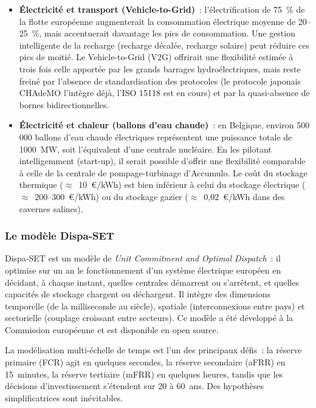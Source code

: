 \begin{itemize}
    \item \textbf{Électricité et transport (Vehicle-to-Grid)}~: l'électrification de 75~\% de la flotte européenne augmenterait la consommation électrique moyenne de 20--25~\%, mais accentuerait davantage les pics de consommation. Une gestion intelligente de la recharge (recharge décalée, recharge solaire) peut réduire ces pics de moitié. Le Vehicle-to-Grid (V2G) offrirait une flexibilité estimée à trois fois celle apportée par les grands barrages hydroélectriques, mais reste freiné par l'absence de standardisation des protocoles (le protocole japonais CHAdeMO l'intègre déjà, l'ISO 15118 est en cours) et par la quasi-absence de bornes bidirectionnelles.

    \item \textbf{Électricité et chaleur (ballons d'eau chaude)}~: en Belgique, environ 500\,000 ballons d'eau chaude électriques représentent une puissance totale de 1000~MW, soit l'équivalent d'une centrale nucléaire. En les pilotant intelligemment (start-up), il serait possible d'offrir une flexibilité comparable à celle de la centrale de pompage-turbinage d'Accumulo. Le coût du stockage thermique ($\approx$~10~€/kWh) est bien inférieur à celui du stockage électrique ($\approx$~200--300~€/kWh) ou du stockage gazier ($\approx$~0,02~€/kWh dans des cavernes salines).
\end{itemize}

\subsubsection{Le modèle Dispa-SET}

Dispa-SET est un modèle de \textit{Unit Commitment and Optimal Dispatch}~: il optimise sur un an le fonctionnement d'un système électrique européen en décidant, à chaque instant, quelles centrales démarrent ou s'arrêtent, et quelles capacités de stockage chargent ou déchargent. Il intègre des dimensions temporelle (de la milliseconde au siècle), spatiale (interconnexions entre pays) et sectorielle (couplage croissant entre secteurs). Ce modèle a été développé à la Commission européenne et est disponible en open source.

La modélisation multi-échelle de temps est l'un des principaux défis~: la réserve primaire (FCR) agit en quelques secondes, la réserve secondaire (aFRR) en 15~minutes, la réserve tertiaire (mFRR) en quelques heures, tandis que les décisions d'investissement s'étendent sur 20 à 60~ans. Des hypothèses simplificatrices sont inévitables.

